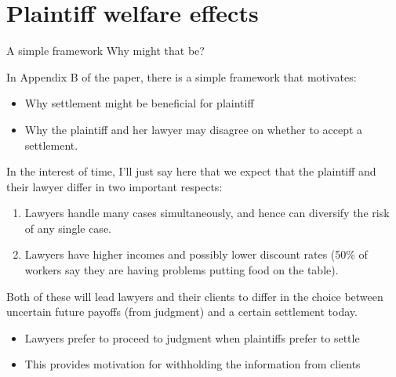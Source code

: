 \documentclass[9pt]{beamer}
\begin{document}
\section{Plaintiff welfare effects}
\begin{frame}{A simple framework}
Why might that be?
\vspace{.1in}

    In Appendix B of the paper, there is a simple framework that motivates:
    \begin{itemize}
        \item Why settlement might be beneficial for plaintiff
        \item Why the plaintiff and her lawyer may disagree on whether to accept a settlement.
    \end{itemize}
    
    \pause
    \vspace{.1in}
    In the interest of time, I'll just say here that we expect that the plaintiff and their lawyer differ in two important respects:
    \begin{enumerate}
        \item Lawyers handle many cases simultaneously, and hence can diversify the risk of any single case.
        \item Lawyers have higher incomes and possibly lower discount rates (50\% of workers say they are having problems putting food on the table).
    \end{enumerate}
    \vspace{3mm}
    
    \pause
    
    Both of these will lead lawyers and their clients to differ in the choice between uncertain future payoffs (from judgment) and a certain settlement today.
    \begin{itemize}
        \item Lawyers prefer to proceed to judgment when plaintiffs prefer to settle
        \item This provides motivation for withholding the information from clients
    \end{itemize}
\end{frame}
\end{document}
